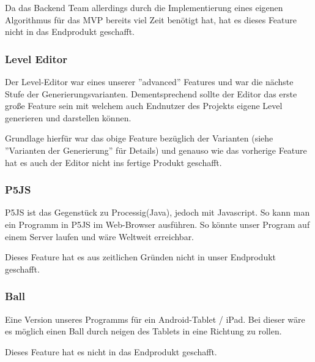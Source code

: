         Da das Backend Team allerdings durch die Implementierung eines eigenen Algorithmus für das MVP bereits viel Zeit benötigt hat, hat es dieses Feature nicht in das Endprodukt geschafft. 


    \subsubsection*{Level Editor}
        Der Level-Editor war eines unserer ''advanced'' Features und war die nächste Stufe der Generierungsvarianten. Dementsprechend sollte der Editor das erste große Feature sein mit welchem auch Endnutzer des Projekts eigene Level generieren und darstellen können. 
        
        Grundlage hierfür war das obige Feature bezüglich der Varianten (siehe ''Varianten der Generierung'' für Details) und genauso wie das vorherige Feature hat es auch der Editor nicht ins fertige Produkt geschafft. 


    \subsubsection*{P5JS}
		P5JS ist das Gegenstück zu Processig(Java), jedoch mit Javascript. So kann man ein Programm in P5JS im Web-Browser ausführen. So könnte unser Program auf einem Server laufen  und wäre Weltweit erreichbar. 
		
		Dieses Feature hat es aus zeitlichen Gründen nicht in unser Endprodukt geschafft.
		 

    \subsubsection*{Ball}
    	Eine Version unseres Programms für ein Android-Tablet / iPad. Bei dieser wäre es möglich einen Ball durch neigen des Tablets in eine Richtung zu rollen.
    	
    	Dieses Feature hat es nicht in das Endprodukt geschafft. 

		
 
		
  
